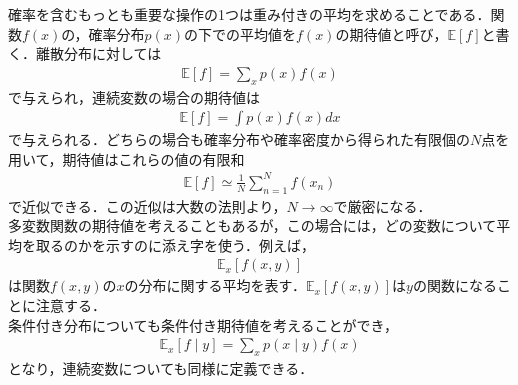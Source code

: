 \documentclass[a4j,11pt]{article}
\begin{document}
\subsubsection{}
確率を含むもっとも重要な操作の1つは重み付きの平均を求めることである．関数$f(x)$の，確率分布$p(x)$の下での平均値を$f(x)$の期待値と呼び，$\mathbb{E}[f]$と書く．離散分布に対しては
\begin{align}
\mathbb{E}[f] = \sum_{x}p(x)f(x)
\end{align}
で与えられ，連続変数の場合の期待値は
\begin{align}
\mathbb{E}[f] = \int p(x)f(x)dx
\end{align}
で与えられる．どちらの場合も確率分布や確率密度から得られた有限個の$N$点を用いて，期待値はこれらの値の有限和
\begin{align}
\mathbb{E}[f] \simeq \frac{1}{N}\sum_{n=1}^N f(x_n)
\end{align}
で近似できる．この近似は大数の法則より，$N\to\infty$で厳密になる．\\
多変数関数の期待値を考えることもあるが，この場合には，どの変数について平均を取るのかを示すのに添え字を使う．例えば，
\begin{align}
\mathbb{E}_x[f(x,y)]
\end{align}
は関数$f(x,y)$の$x$の分布に関する平均を表す．$\mathbb{E}_x[f(x,y)]$は$y$の関数になることに注意する．\\
条件付き分布についても条件付き期待値を考えることができ，
\begin{align}
\mathbb{E}_x[f\mid y] = \sum_{x}p(x\mid y)f(x)
\end{align}
となり，連続変数についても同様に定義できる．
\end{document}
